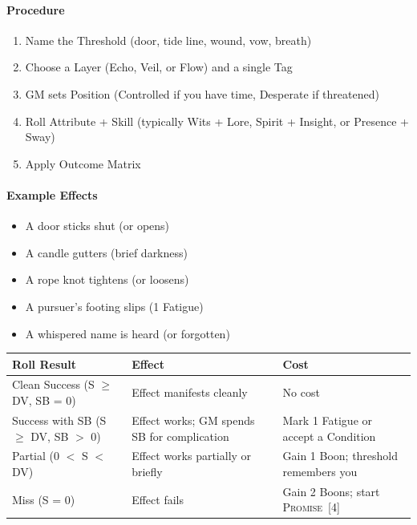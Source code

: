 \documentclass[11pt,letterpaper]{article}
\newcommand{\timer}[2]{\textsc{#1}~[#2]}
\begin{document}
\paragraph{Procedure}
\begin{enumerate}
    \item Name the Threshold (door, tide line, wound, vow, breath)
    \item Choose a Layer (Echo, Veil, or Flow) and a single Tag
    \item GM sets Position (Controlled if you have time, Desperate if threatened)
    \item Roll Attribute + Skill (typically Wits + Lore, Spirit + Insight, or Presence + Sway)
    \item Apply Outcome Matrix
\end{enumerate}

\paragraph{Example Effects}
\begin{itemize}
    \item A door sticks shut (or opens)
    \item A candle gutters (brief darkness)
    \item A rope knot tightens (or loosens)
    \item A pursuer's footing slips (1 Fatigue)
    \item A whispered name is heard (or forgotten)
\end{itemize}

\begin{table}[H]
\centering
\begin{tabularx}{0.95\linewidth}{@{}lXX@{}}
\toprule
\textbf{Roll Result} & \textbf{Effect} & \textbf{Cost} \\
\midrule
Clean Success (S $\ge$ DV, SB = 0) & Effect manifests cleanly & No cost \\
Success with SB (S $\ge$ DV, SB $>$ 0) & Effect works; GM spends SB for complication & Mark 1 Fatigue or accept a Condition \\
Partial (0 $<$ S $<$ DV) & Effect works partially or briefly & Gain 1 Boon; threshold remembers you \\
Miss (S = 0) & Effect fails & Gain 2 Boons; start \timer{Promise}{4} \\
\bottomrule
\end{tabularx}
\end{table}
\end{document}
